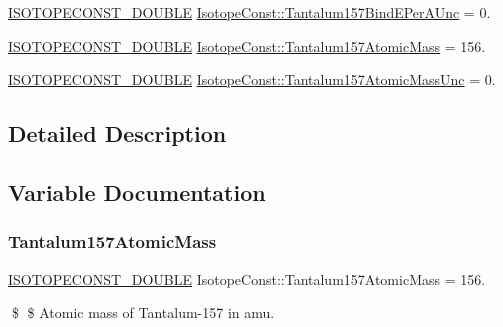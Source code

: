 \begin{DoxyCompactItemize}
\mbox{\hyperlink{group___isotope_const-_macros_ga8f45a7272ce02c0b4c65c44636ed719a}{I\+S\+O\+T\+O\+P\+E\+C\+O\+N\+S\+T\+\_\+\+D\+O\+U\+B\+LE}} \mbox{\hyperlink{group___isotope_const-_tantalum-_ta157_ga64e5f58a3a8890654372a18c8dce97e4}{Isotope\+Const\+::\+Tantalum157\+Bind\+E\+Per\+A\+Unc}} = 0.
\item 
\mbox{\hyperlink{group___isotope_const-_macros_ga8f45a7272ce02c0b4c65c44636ed719a}{I\+S\+O\+T\+O\+P\+E\+C\+O\+N\+S\+T\+\_\+\+D\+O\+U\+B\+LE}} \mbox{\hyperlink{group___isotope_const-_tantalum-_ta157_ga8247f8eace5056a551b66c8ade3b9f32}{Isotope\+Const\+::\+Tantalum157\+Atomic\+Mass}} = 156.
\item 
\mbox{\hyperlink{group___isotope_const-_macros_ga8f45a7272ce02c0b4c65c44636ed719a}{I\+S\+O\+T\+O\+P\+E\+C\+O\+N\+S\+T\+\_\+\+D\+O\+U\+B\+LE}} \mbox{\hyperlink{group___isotope_const-_tantalum-_ta157_ga6a073fd9d54416fd30dd15a47fec26ba}{Isotope\+Const\+::\+Tantalum157\+Atomic\+Mass\+Unc}} = 0.
\end{DoxyCompactItemize}


\subsection{Detailed Description}


\subsection{Variable Documentation}
\mbox{\label{group___isotope_const-_tantalum-_ta157_ga8247f8eace5056a551b66c8ade3b9f32}} 
\subsubsection{\texorpdfstring{Tantalum157\+Atomic\+Mass}{Tantalum157AtomicMass}}
{\footnotesize\ttfamily \mbox{\hyperlink{group___isotope_const-_macros_ga8f45a7272ce02c0b4c65c44636ed719a}{I\+S\+O\+T\+O\+P\+E\+C\+O\+N\+S\+T\+\_\+\+D\+O\+U\+B\+LE}} Isotope\+Const\+::\+Tantalum157\+Atomic\+Mass = 156.}

\$ \$ Atomic mass of Tantalum-\/157 in amu. \mbox{\label{group___isotope_const-_tantalum-_ta157_ga6a073fd9d54416fd30dd15a47fec26ba}} 
